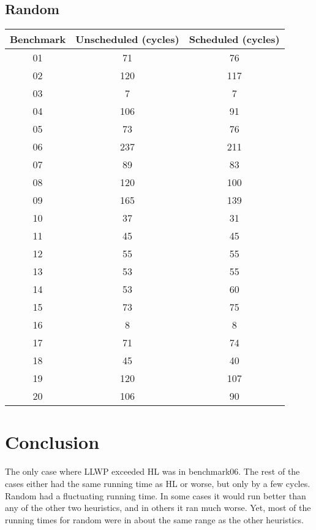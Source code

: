 \documentclass{article}
\begin{document}
\subsection{Random}
\begin{center}
    \begin{tabular} {|c | c | c|}
        \hline
        Benchmark & Unscheduled (cycles)  & Scheduled (cycles) \\ \hline \hline
        01 & 71 & 76 \\ \hline
        02 & 120 & 117 \\ \hline
        03 & 7 & 7 \\ \hline
        04 & 106 & 91 \\ \hline
        05 & 73 & 76 \\ \hline
        06 & 237 & 211 \\ \hline
        07 & 89 & 83 \\ \hline
        08 & 120 & 100 \\ \hline
        09 & 165 & 139 \\ \hline
        10 & 37 & 31 \\ \hline
        11 & 45 & 45 \\ \hline
        12 & 55 & 55 \\ \hline
        13 & 53 & 55 \\ \hline
        14 & 53 & 60 \\ \hline
        15 & 73 & 75 \\ \hline
        16 & 8 & 8 \\ \hline
        17 & 71 & 74 \\ \hline
        18 & 45 & 40 \\ \hline
        19 & 120 & 107 \\ \hline
        20 & 106 & 90 \\ 
        \hline
    \end{tabular}
\end{center}

\section{Conclusion}
The only case where LLWP exceeded HL was in benchmark06. The rest of the cases either had the same running time as HL or worse, but only by a few cycles. Random had a fluctuating running time. In some cases it would run better than any of the other two heuristics, and in others it ran much worse. Yet, most of the running times for random were in about the same range as the other heuristics. 
\end{document}
